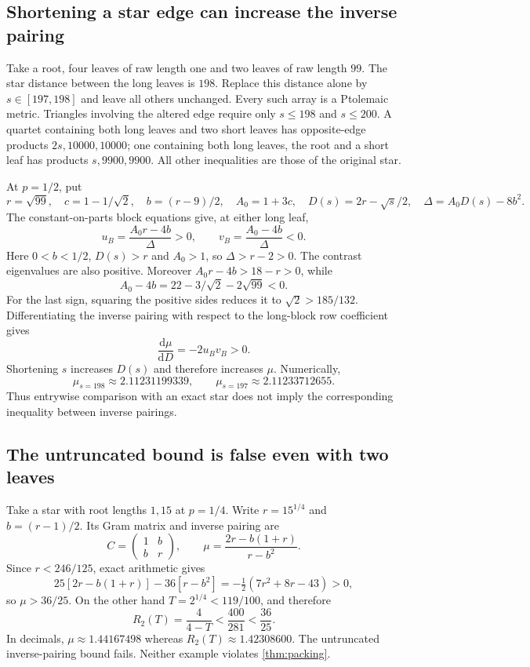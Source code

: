 \documentclass[11pt,a4paper]{article}
\theoremstyle{definition}
\theoremstyle{remark}
\numberwithin{equation}{section}
\newcommand{\dd}{\mathrm d}
\begin{document}
\subsection{Shortening a star edge can increase the inverse pairing}
Take a root, four leaves of raw length one and two leaves of raw length $99$. The star distance between the long leaves is $198$. Replace this distance alone by $s\in[197,198]$ and leave all others unchanged. Every such array is a Ptolemaic metric. Triangles involving the altered edge require only $s\le198$ and $s\le200$. A quartet containing both long leaves and two short leaves has opposite-edge products $2s,10000,10000$; one containing both long leaves, the root and a short leaf has products $s,9900,9900$. All other inequalities are those of the original star.

At $p=1/2$, put
\[
 r=\sqrt{99},\quad c=1-1/\sqrt2,\quad b=(r-9)/2,
 \quad A_0=1+3c,\quad D(s)=2r-\sqrt{s}/2,
 \quad\Delta=A_0D(s)-8b^2.
\]
The constant-on-parts block equations give, at either long leaf,
\[
 u_B=\frac{A_0r-4b}{\Delta}>0,
 \qquad v_B=\frac{A_0-4b}{\Delta}<0.
\]
Here $0<b<1/2$, $D(s)>r$ and $A_0>1$, so $\Delta>r-2>0$. The contrast eigenvalues are also positive. Moreover $A_0r-4b>18-r>0$, while
\[
 A_0-4b=22-3/\sqrt2-2\sqrt{99}<0.
\]
For the last sign, squaring the positive sides reduces it to $\sqrt2>185/132$. Differentiating the inverse pairing with respect to the long-block row coefficient gives
\[
 \frac{\dd\mu}{\dd D}=-2u_Bv_B>0.
\]
Shortening $s$ increases $D(s)$ and therefore increases $\mu$. Numerically,
\[
 \mu_{s=198}\approx2.11231199339,
 \qquad \mu_{s=197}\approx2.11233712655.
\]
Thus entrywise comparison with an exact star does not imply the corresponding inequality between inverse pairings.

\subsection{The untruncated bound is false even with two leaves}
Take a star with root lengths $1,15$ at $p=1/4$. Write $r=15^{1/4}$ and $b=(r-1)/2$. Its Gram matrix and inverse pairing are
\[
 C=\begin{pmatrix}1&b\\b&r\end{pmatrix},\qquad
 \mu=\frac{2r-b(1+r)}{r-b^2}.
\]
Since $r<246/125$, exact arithmetic gives
\[
 25[2r-b(1+r)]-36[r-b^2]
 =-\tfrac12(7r^2+8r-43)>0,
\]
so $\mu>36/25$. On the other hand $T=2^{1/4}<119/100$, and therefore
\[
 R_2(T)=\frac4{4-T}<\frac{400}{281}<\frac{36}{25}.
\]
In decimals, $\mu\approx1.44167498$ whereas $R_2(T)\approx1.42308600$. The untruncated inverse-pairing bound fails. Neither example violates \cref{thm:packing}.
\end{document}
